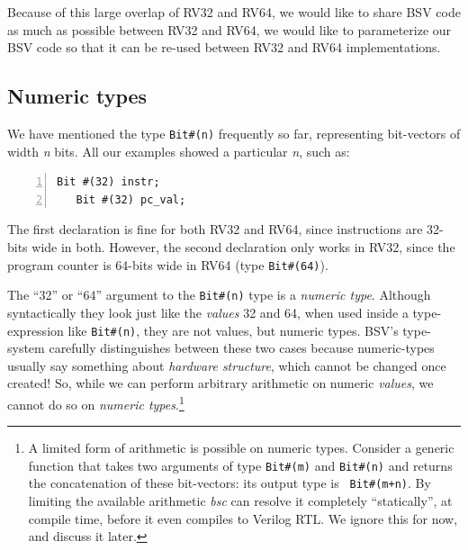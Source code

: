 Because of this large overlap of RV32 and RV64, we would like to share
BSV code as much as possible between RV32 and RV64, {\ie} we would
like to parameterize our BSV code so that it can be re-used between
RV32 and RV64 implementations.


\subsection{Numeric types}

\label{BSV_Numeric_types}

We have mentioned the type \verb|Bit#(n)| frequently so far,
representing bit-vectors of width \emph{n} bits.  All our examples
showed a particular \emph{n}, such as:

{\small
\begin{Verbatim}[frame=single, numbers=left]
   Bit #(32) instr;
   Bit #(32) pc_val;
\end{Verbatim}
}

The first declaration is fine for both RV32 and RV64, since
instructions are 32-bits wide in both.  However, the second
declaration only works in RV32, since the program counter is 64-bits
wide in RV64 (type \verb|Bit#(64)|).

\label{BSV_numeric_types}

The ``32'' or ``64'' argument to the \verb|Bit#(n)| type is a
\emph{numeric type}.  Although syntactically they look just like the
\emph{values} 32 and 64, when used inside a type-expression like
\verb|Bit#(n)|, they are not values, but numeric types.  BSV's
type-system carefully distinguishes between these two cases because
numeric-types usually say something about \emph{hardware structure},
which cannot be changed once created!  So, while we can perform
arbitrary arithmetic on numeric \emph{values}, we cannot do so on
\emph{numeric types}.\footnote{A limited form of arithmetic is
possible on numeric types.  Consider a generic function that takes two
arguments of type {\tt Bit\#(m)} and {\tt Bit\#(n)} and returns the
concatenation of these bit-vectors: its output type is {\tt
Bit\#(m+n)}.  By limiting the available arithmetic \emph{bsc} can
resolve it completely ``statically'', {\ie} at compile time, before it
even compiles to Verilog RTL.  We ignore this for now, and discuss it
later.}


